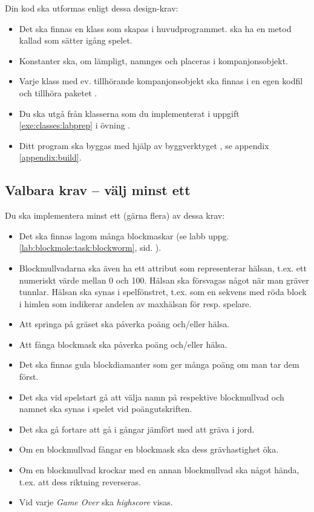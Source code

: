\vspace{1em}\noindent Din kod ska utformas enligt dessa design-krav:
\begin{itemize}[nosep, label={$\square$}]
\item Det ska finnas en klass  som skapas i huvudprogrammet.  ska ha en metod kallad  som sätter igång spelet.
\item Konstanter ska, om lämpligt, namnges och placeras i kompanjonsobjekt.
\item Varje klass med ev. tillhörande kompanjonsobjekt ska finnas i en egen kodfil och tillhöra paketet .
\item Du ska utgå från klasserna som du implementerat i uppgift \ref{exe:classes:labprep} i övning \texttt{\ExeWeekFIVE}.
\item Ditt program ska byggas med hjälp av byggverktyget , se appendix \ref{appendix:build}.
\end{itemize}


\subsection{Valbara krav -- välj minst ett}

Du ska implementera minst ett (gärna flera) av dessa krav:
\begin{itemize}[nosep, label={$\square$}]
\item Det ska finnas lagom många blockmaskar (se labb  uppg. \ref{lab:blockmole:task:blockworm},  sid. \pageref{lab:blockmole:task:blockworm}).
\item Blockmullvadarna ska även ha ett attribut som representerar hälsan, t.ex. ett numeriskt värde mellan 0 och 100. Hälsan ska försvagas något när man gräver tunnlar. Hälsan ska synas i spelfönstret, t.ex. som en sekvens med röda block i himlen som indikerar andelen av maxhälsan för resp. spelare.
\item Att springa på gräset ska påverka poäng och/eller hälsa.
\item Att fånga blockmask ska påverka poäng och/eller hälsa.
\item Det ska finnas gula blockdiamanter som ger många poäng om man tar dem först.
\item Det ska vid spelstart gå att välja namn på respektive blockmullvad och namnet ska synas i spelet vid poängutskriften.
\item Det ska gå fortare att gå i gångar jämfört med att gräva i jord.
\item Om en blockmullvad fångar en blockmask ska dess grävhastighet öka.
\item Om en blockmullvad krockar med en annan blockmullvad ska något hända, t.ex. att dess riktning reverseras.
\item Vid varje \emph{Game Over} ska \emph{highscore} visas.
\end{itemize}

